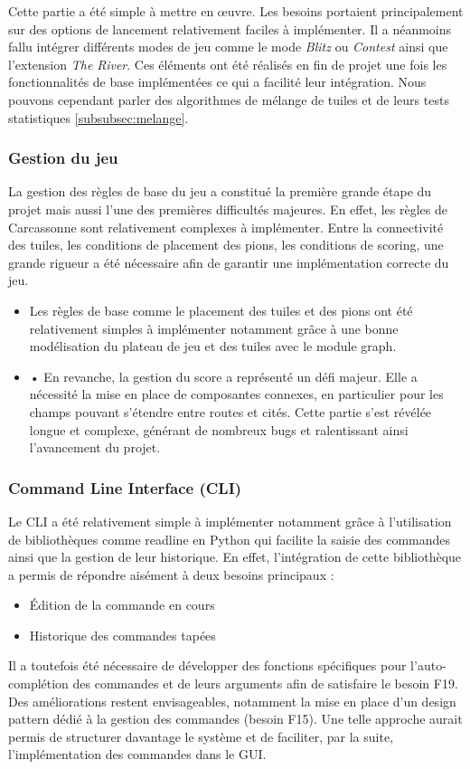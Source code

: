 \documentclass[11pt]{article}
\begin{document}
Cette partie a été simple à mettre en œuvre. Les besoins portaient principalement sur des options de lancement relativement faciles à implémenter.
Il a néanmoins fallu intégrer différents modes de jeu comme le mode \textit{Blitz} ou \textit{Contest} ainsi que l'extension \textit{The River}. 
Ces éléments ont été réalisés en fin de projet une fois les fonctionnalités de base implémentées ce qui a facilité leur intégration.
Nous pouvons cependant parler des algorithmes de mélange de tuiles et de leurs tests statistiques \ref{subsubsec:melange}.



\subsubsection{Gestion du jeu}

La gestion des règles de base du jeu a constitué la première grande étape du projet mais aussi l’une des premières difficultés majeures. En effet, les règles de Carcassonne sont relativement complexes à implémenter.
Entre la connectivité des tuiles, les conditions de placement des pions, les conditions de scoring, une grande rigueur a été nécessaire afin de garantir une implémentation correcte du jeu.
\begin{itemize}
  \item [$\bullet$] Les règles de base comme le placement des tuiles et des pions ont été relativement simples à implémenter notamment grâce à une bonne modélisation du plateau de jeu et des tuiles avec le module graph.
  \item [$\bullet$] •	En revanche, la gestion du score a représenté un défi majeur. Elle a nécessité la mise en place de composantes connexes, en particulier pour les champs pouvant s’étendre entre routes et cités. 
  Cette partie s’est révélée longue et complexe, générant de nombreux bugs et ralentissant ainsi l’avancement du projet.
\end{itemize}

\subsubsection{Command Line Interface (CLI)}

Le CLI a été relativement simple à implémenter notamment grâce à l’utilisation de bibliothèques comme readline en Python qui facilite la saisie des commandes ainsi que la gestion de leur historique. En effet, l’intégration de cette bibliothèque a permis de répondre aisément à deux besoins principaux :
\begin{itemize}
  \item[-] Édition de la commande en cours
  \item[-] Historique des commandes tapées
\end{itemize}
Il a toutefois été nécessaire de développer des fonctions spécifiques pour l’auto-complétion des commandes et de leurs arguments afin de satisfaire le besoin F19.
Des améliorations restent envisageables, notamment la mise en place d’un design pattern dédié à la gestion des commandes (besoin F15). 
Une telle approche aurait permis de structurer davantage le système et de faciliter, par la suite, l’implémentation des commandes dans le GUI.
\end{document}
